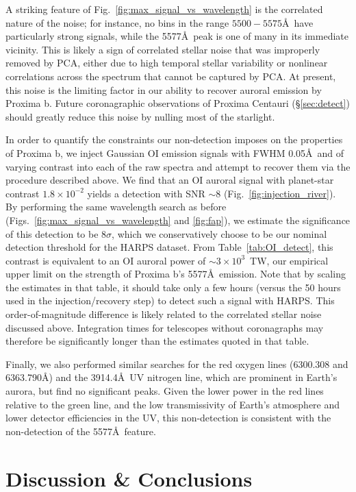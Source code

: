\documentclass{emulateapj}
\begin{document}
A striking feature of Fig.~\ref{fig:max_signal_vs_wavelength} is the correlated nature of the noise; for instance, no bins in the range $5500 - 5575$\AA\ have particularly strong signals, while the 5577\AA\ peak is one of many in its immediate vicinity. This is likely a sign of correlated stellar noise that was improperly removed by PCA, either due to high temporal stellar variability or nonlinear correlations across the spectrum that cannot be captured by PCA. At present, this noise is the limiting factor in our ability to recover auroral emission by Proxima b. Future coronagraphic observations of Proxima Centauri (\S\ref{sec:detect}) should greatly reduce this noise by nulling most of the starlight.

In order to quantify the constraints our non-detection imposes on the properties of Proxima b, we inject Gaussian OI emission signals with FWHM 0.05\AA\ and of varying contrast into each of the raw spectra and attempt to recover them via the procedure described above. We find that an OI auroral signal with planet-star contrast $1.8\times 10^{-2}$ yields a detection with SNR ${\sim} 8$ (Fig.~\ref{fig:injection_river}). By performing the same wavelength search as before (Figs.~\ref{fig:max_signal_vs_wavelength} and \ref{fig:fap}), we estimate the significance of this detection to be $8\sigma$, which we conservatively choose to be our nominal detection threshold for the HARPS dataset. From Table~\ref{tab:OI_detect}, this contrast is equivalent to an OI auroral power of ${\sim} 3\times 10^{3}$~TW, our empirical upper limit on the strength of Proxima b's 5577\AA\ emission. Note that by scaling the estimates in that table, it should take only a few hours (versus the 50 hours used in the injection/recovery step) to detect such a signal with HARPS. This order-of-magnitude difference is likely related to the correlated stellar noise discussed above. Integration times for telescopes without coronagraphs may therefore be significantly longer than the estimates quoted in that table.

Finally, we also performed similar searches for the red oxygen lines (6300.308 and 6363.790\AA) and the 3914.4\AA\ UV nitrogen line, which are prominent in Earth's aurora, but find no significant peaks. Given the lower power in the red lines relative to the green line, and the low transmissivity of Earth's atmosphere and lower detector efficiencies in the UV, this non-detection is consistent with the non-detection of the 5577\AA\ feature.
  
\section{Discussion \& Conclusions}
\label{sec:disc}
\end{document}

